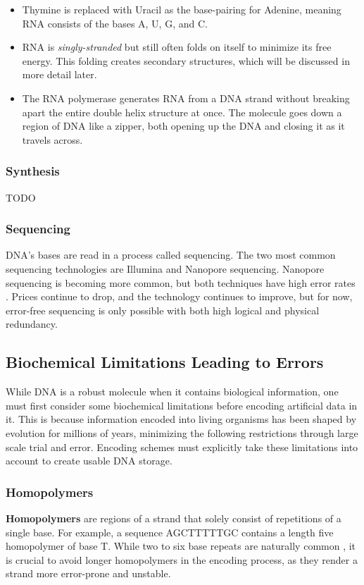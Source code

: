 \documentclass[a4paper,conference]{IEEEtran}
\begin{document}
\begin{itemize}
    \item Thymine is replaced with Uracil as the base-pairing for Adenine, meaning RNA consists of the bases A, U, G, and C.
    \item RNA is \textit{singly-stranded} but still often folds on itself to minimize its free energy. This folding creates secondary structures, which will be discussed in more detail later.
    \item The RNA polymerase generates RNA from a DNA strand without breaking apart the entire double helix structure at once. The molecule goes down a region of DNA like a zipper, both opening up the DNA and closing it as it travels across.
\end{itemize}

\subsubsection{Synthesis}
TODO

\subsubsection{Sequencing}
DNA's bases are read in a process called sequencing. The two most common sequencing technologies are Illumina and Nanopore sequencing. Nanopore sequencing is becoming more common, but both techniques have high error rates \cite{pcrbased}. Prices continue to drop, and the technology continues to improve, but for now, error-free sequencing is only possible with both high logical and physical redundancy.


\subsection{Biochemical Limitations Leading to Errors}
While DNA is a robust molecule when it contains biological information, one must first consider some biochemical limitations before encoding artificial data in it. This is because information encoded into living organisms has been shaped by evolution for millions of years, minimizing the following restrictions through large scale trial and error. Encoding schemes must explicitly take these limitations into account to create usable DNA storage. \\

\subsubsection{Homopolymers}
\textbf{Homopolymers} are regions of a strand that solely consist of repetitions of a single base. For example, a sequence AGCTTTTTGC contains a length five homopolymer of base T. While two to six base repeats are naturally common \cite{homopolymer}, it is crucial to avoid longer homopolymers in the encoding process, as they render a strand more error-prone \cite{homopolymererrors} and unstable. \\
\end{document}
